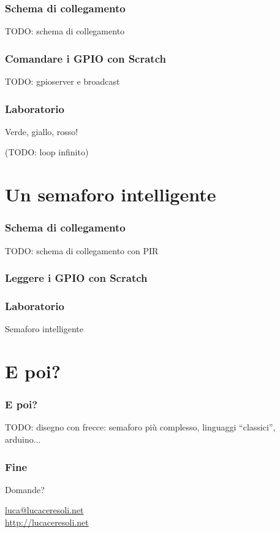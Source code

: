 \documentclass[xetex,table]{beamer}
\begin{document}
\begin{frame}
  \frametitle{Schema di collegamento}
  TODO: schema di collegamento
\end{frame}

\begin{frame}
  \frametitle{Comandare i GPIO con Scratch}
  TODO: gpioserver e broadcast
\end{frame}

\begin{frame}
\frametitle[Lab! Verde, giallo, rosso!]{Laboratorio}
  \begin{center}
    \LARGE
    Verde, giallo, rosso!

    (TODO: loop infinito)
  \end{center}
\end{frame}

\section{Un semaforo intelligente}

\begin{frame}
  \frametitle{Schema di collegamento}
  TODO: schema di collegamento con PIR
\end{frame}

\begin{frame}
  \frametitle{Leggere i GPIO con Scratch}
\end{frame}

\begin{frame}
\frametitle[Lab! Semaforo intelligente!]{Laboratorio}
  \begin{center}
    \LARGE
    Semaforo intelligente
  \end{center}
\end{frame}

\section{E poi?}

\begin{frame}
  \frametitle{E poi?}
  TODO: disegno con frecce: semaforo più complesso, linguaggi ``classici'', arduino...
\end{frame}

\begin{frame}
  \frametitle{Fine}

  \begin{center}
    {\Huge Domande?}

    \vspace{0.1\textheight}

    \href{mailto:luca@lucaceresoli.net}{luca@lucaceresoli.net}\\
    \url{http://lucaceresoli.net}
  \end{center}
\end{frame}
\end{document}
